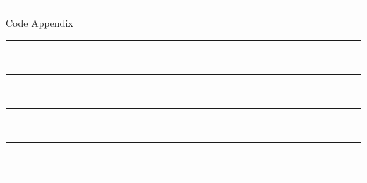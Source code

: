 \documentclass[a4paper, 11pt]{report}
\begin{document}
	\noindent\rule{\textwidth}{1pt} 
	\begin{center} 
		Code Appendix
	\end{center}
	\vspace*{-7pt}
	\noindent\rule{\textwidth}{1pt} \\
	
	\noindent\rule{\textwidth}{1pt} \\
	
	\noindent\rule{\textwidth}{1pt} \\
	
	\noindent\rule{\textwidth}{1pt} \\
	
	\noindent\rule{\textwidth}{1pt} \\	
\end{document}
